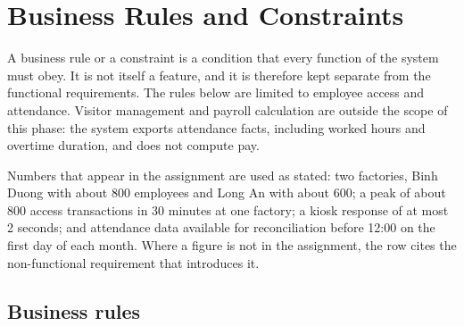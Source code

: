 \section{Business Rules and Constraints}
\label{sec:rules}

A business rule or a constraint is a condition that every function of the system must obey.
It is not itself a feature, and it is therefore kept separate from the functional requirements.
The rules below are limited to employee access and attendance.
Visitor management and payroll calculation are outside the scope of this phase: the system exports attendance facts, including worked hours and overtime duration, and does not compute pay.

Numbers that appear in the assignment are used as stated: two factories, Binh Duong with about 800 employees and Long An with about 600; a peak of about 800 access transactions in 30 minutes at one factory; a kiosk response of at most 2 seconds; and attendance data available for reconciliation before 12:00 on the first day of each month.
Where a figure is not in the assignment, the row cites the non-functional requirement that introduces it.

\subsection{Business rules}

